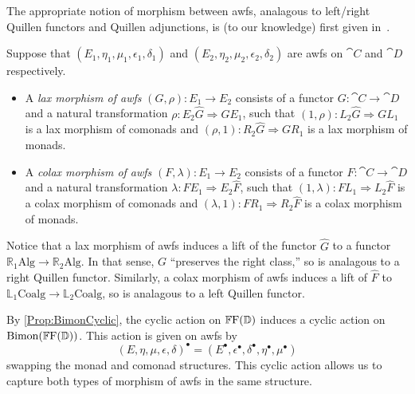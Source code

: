 The appropriate notion of morphism between awfs, analagous to left/right Quillen functors and Quillen adjunctions, is (to our knowledge) first given in~\cite{riehl:nwfs-model}.

\begin{definition}
	Suppose that $(E_1,\eta_1,\mu_1,\epsilon_1,\delta_1)$ and $(E_2,\eta_2,\mu_2,\epsilon_2,\delta_2)$ are awfs on $\cat{C}$ and $\cat{D}$ respectively. 
	\begin{itemize}
		\item A \emph{lax morphism of awfs} $(G,\rho)\colon E_1\to E_2$ consists of a functor $G\colon\cat{C}\to\cat{D}$ and a natural transformation $\rho\colon E_2\hat{G}\Rightarrow GE_1$, such that $(1,\rho)\colon L_2\hat{G}\Rightarrow GL_1$ is a lax morphism of comonads and $(\rho,1)\colon R_2\hat{G}\Rightarrow GR_1$ is a lax morphism of monads.
		\item A \emph{colax morphism of awfs} $(F,\lambda)\colon E_1\to E_2$ consists of a functor $F\colon\cat{C}\to\cat{D}$ and a natural transformation $\lambda\colon FE_1\Rightarrow E_2\hat{F}$, such that $(1,\lambda)\colon FL_1\Rightarrow L_2\hat{F}$ is a colax morphism of comonads and $(\lambda,1)\colon FR_1\Rightarrow R_2\hat{F}$ is a colax morphism of monads.
	\end{itemize}
\end{definition}

Notice that a lax morphism of awfs induces a lift of the functor $\hat{G}$ to a functor $\mathbb{R}_1\mathrm{Alg}\to \mathbb{R}_2\mathrm{Alg}$. In that sense, $G$ ``preserves the right class,'' so is analagous to a right Quillen functor. Similarly, a colax morphism of awfs induces a lift of $\hat{F}$ to $\mathbb{L}_1\mathrm{Coalg}\to\mathbb{L}_2\mathrm{Coalg}$, so is analagous to a left Quillen functor.

By \cref{Prop:BimonCyclic}, the cyclic action on $\mathbb{F}\mathrm{F}(\mathbb{D})$ induces a cyclic action on $\mathrm{Bimon}(\mathbb{F}\mathrm{F}(\mathbb{D}))$. This action is given on awfs by
\[
	(E,\eta,\mu,\epsilon,\delta)^{\bullet} = (E^{\bullet},\epsilon^{\bullet},\delta^{\bullet},\eta^{\bullet},\mu^{\bullet})
\]
swapping the monad and comonad structures. This cyclic action allows us to capture both types of morphism of awfs in the same structure.

